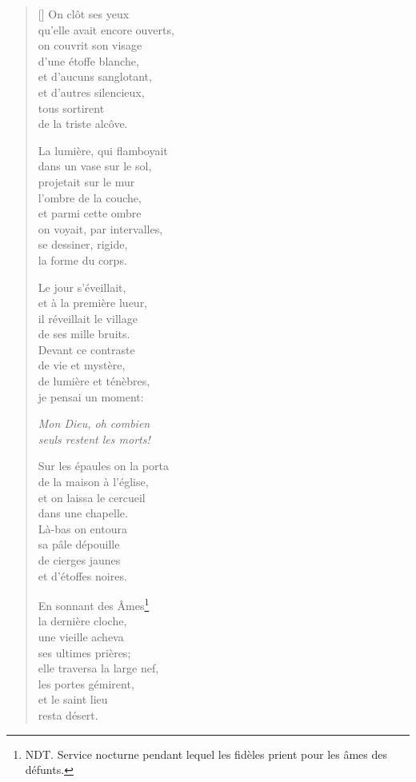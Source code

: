 \documentclass[a4paper,12pt]{book}
\begin{document}
\begin{verse}[\versewidth]
  On clôt ses yeux \\
  qu'elle avait encore ouverts, \\
  on couvrit son visage \\
  d'une étoffe blanche, \\
  et d'aucuns sanglotant, \\
  et d'autres silencieux, \\
  tous sortirent \\
  de la triste alcôve.

  La lumière, qui flamboyait \\
  dans un vase sur le sol, \\
  projetait sur le mur \\
  l'ombre de la couche, \\
  et parmi cette ombre \\
  on voyait, par intervalles, \\
  se dessiner, rigide, \\
  la forme du corps.

  Le jour s'éveillait, \\
  et à la première lueur, \\
  il réveillait le village \\
  de ses mille bruits. \\
  Devant ce contraste \\
  de vie et mystère, \\
  de lumière et ténèbres, \\
  je pensai un moment:

  \emph{Mon Dieu, oh combien \\
  seuls restent les morts!}

  Sur les épaules on la porta \\
  de la maison à l'église, \\
  et on laissa le cercueil \\
  dans une chapelle. \\
  Là-bas on entoura \\
  sa pâle dépouille \\
  de cierges jaunes \\
  et d'étoffes noires.

  En sonnant des Âmes\footnote{NDT. Service nocturne pendant lequel les
  fidèles prient pour les âmes des défunts.} \\
  la dernière cloche, \\
  une vieille acheva \\
  ses ultimes prières; \\
  elle traversa la large nef, \\
  les portes gémirent, \\
  et le saint lieu \\
  resta désert.


\end{verse}
\end{document}
